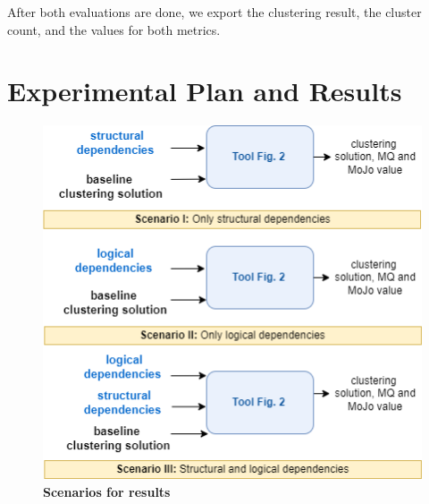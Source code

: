 \documentclass{ieeeaccess}
\begin{document}
After both evaluations are done, we export the clustering result, the cluster count, and the values for both metrics.

\section{Experimental Plan and Results}
\label{sec:experiment}

\begin{figure}[t!]
  \centering
  \includegraphics[width=\columnwidth]{scenario.png}
  \caption{ \textbf{Scenarios for results}}
  \label{fig:scenatrio}
\end{figure}
\end{document}
